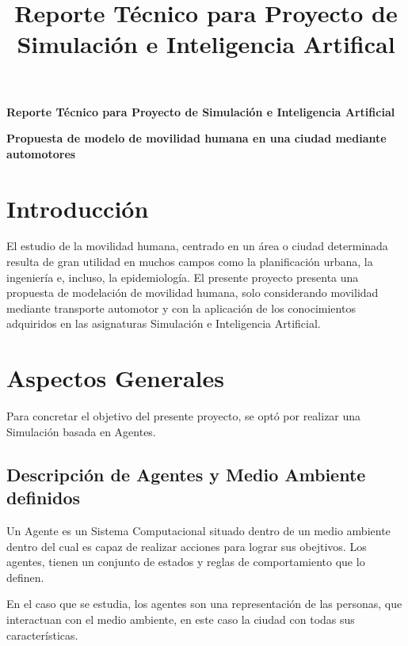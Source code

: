 \documentclass{article}
\title{Reporte Técnico para Proyecto de Simulación e Inteligencia Artifical}
\begin{document}
\begin{titlepage}
    \centering
{\bfseries\Huge Reporte Técnico para Proyecto de Simulación e Inteligencia Artificial \par}
\vspace{2cm}
{\bfseries\Large Propuesta de modelo de movilidad humana en una ciudad mediante automotores}
\vspace{2cm}

\end{titlepage}

\section{Introducción}
El estudio de la movilidad humana, centrado en un área o ciudad determinada resulta de gran utilidad en muchos campos como la planificación urbana, la ingeniería e, incluso, la epidemiología.
El presente proyecto presenta una propuesta de modelación de movilidad humana, solo considerando movilidad mediante transporte automotor y con la aplicación de los conocimientos adquiridos en las asignaturas Simulación e Inteligencia Artificial. 

\newpage

\section{Aspectos Generales}
Para concretar el objetivo del presente proyecto, se optó por realizar una Simulación basada en Agentes. 

\subsection{Descripción de Agentes y Medio Ambiente definidos}

Un Agente es un Sistema Computacional situado dentro de un medio ambiente dentro del cual es capaz de realizar acciones para lograr sus obejtivos. Los agentes, tienen un conjunto de estados y reglas de comportamiento que lo definen. 

En el caso que se estudia, los agentes son una representación de las personas, que interactuan con el medio ambiente, en este caso la ciudad con todas sus características. 
\end{document}
